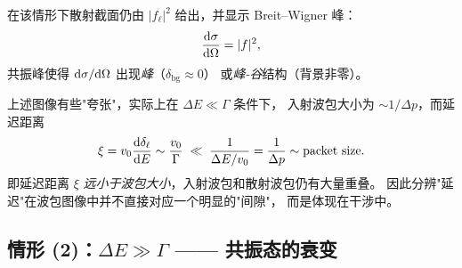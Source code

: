 \begin{remark}[对截面的影响]
  在该情形下散射截面仍由 $|f_\ell|^2$ 给出，并显示 Breit--Wigner 峰：
  \begin{equation}
    \frac{\mathrm{d}\sigma}{\mathrm{d}\Omega}=|f|^2,
  \end{equation}
  共振峰使得 $\mathrm{d}\sigma/\mathrm{d}\Omega$ 出现\emph{峰}（$\delta_{\mathrm{bg}}\approx 0$）
  或\emph{峰-谷}结构（背景非零）。
\end{remark}

\begin{remark}[延迟距离与波包大小]
  上述图像有些"夸张"，实际上在 $\Delta E\ll\Gamma$ 条件下，
  入射波包大小为 $\sim 1/\Delta p$，而延迟距离
  \begin{equation}
    \xi=v_0\frac{\mathrm{d}\delta_\ell}{\mathrm{d} E}\sim \frac{v_0}{\Gamma}
    \;\ll\;\frac{1}{\Delta E/v_0}=\frac{1}{\Delta p}\sim\text{packet size}.
  \end{equation}
  即延迟距离 $\xi$ \emph{远小于波包大小}，入射波包和散射波包仍有大量重叠。
  因此分辨"延迟"在波包图像中并不直接对应一个明显的"间隙"，
  而是体现在干涉中。
\end{remark}

\subsection{情形 (2)：$\Delta E\gg\Gamma$ —— 共振态的衰变}

